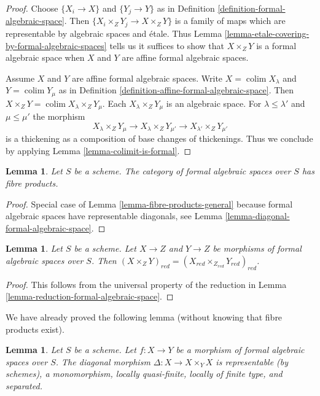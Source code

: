 \documentclass{stacks-project}
\theoremstyle{plain}
\newtheorem{lemma}[subsection]{Lemma}
\theoremstyle{definition}
\theoremstyle{remark}
\numberwithin{equation}{subsection}
\def\colim{\mathop{\mathrm{colim}}\nolimits}
\begin{document}
\begin{proof}
Choose $\{X_i \to X\}$ and $\{Y_j \to Y\}$ as in
Definition \ref{definition-formal-algebraic-space}.
Then $\{X_i \times_Z Y_j \to X \times_Z Y\}$ is a family
of maps which are representable by algebraic spaces and \'etale.
Thus Lemma \ref{lemma-etale-covering-by-formal-algebraic-spaces}
tells us it suffices to show that $X \times_Z Y$ is a formal
algebraic space when $X$ and $Y$ are affine formal algebraic spaces.

\medskip\noindent
Assume $X$ and $Y$ are affine formal algebraic spaces.
Write $X = \colim X_\lambda$ and $Y = \colim Y_\mu$ as
in Definition \ref{definition-affine-formal-algebraic-space}.
Then $X \times_Z Y = \colim X_\lambda \times_Z Y_\mu$.
Each $X_\lambda \times_Z Y_\mu$ is an algebraic space.
For $\lambda \leq \lambda'$ and $\mu \leq \mu'$ the morphism
$$
X_\lambda \times_Z Y_\mu \to
X_\lambda \times_Z Y_{\mu'} \to
X_{\lambda'} \times_Z Y_{\mu'}
$$
is a thickening as a composition of base changes of thickenings.
Thus we conclude by applying Lemma \ref{lemma-colimit-is-formal}.
\end{proof}

\begin{lemma}
\label{lemma-fibre-products}
Let $S$ be a scheme. The category of formal algebraic spaces over $S$
has fibre products.
\end{lemma}

\begin{proof}
Special case of Lemma \ref{lemma-fibre-products-general}
because formal algebraic spaces have representable diagonals, see
Lemma \ref{lemma-diagonal-formal-algebraic-space}.
\end{proof}

\begin{lemma}
\label{lemma-reduction-fibre-products}
Let $S$ be a scheme. Let $X \to Z$ and $Y \to Z$ be morphisms of
formal algebraic spaces over $S$. Then
$(X \times_Z Y)_{red} = (X_{red} \times_{Z_{red}} Y_{red})_{red}$.
\end{lemma}

\begin{proof}
This follows from the universal property of the reduction
in Lemma \ref{lemma-reduction-formal-algebraic-space}.
\end{proof}

\noindent
We have already proved the following lemma (without knowing that
fibre products exist).

\begin{lemma}
\label{lemma-diagonal-morphism-formal-algebraic-spaces}
Let $S$ be a scheme. Let $f : X \to Y$ be a morphism of formal algebraic spaces
over $S$. The diagonal morphism $\Delta : X \to X \times_Y X$
is representable (by schemes), a monomorphism, locally quasi-finite,
locally of finite type, and separated.
\end{lemma}
\end{document}
